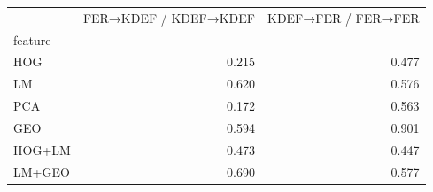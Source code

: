\begin{tabular}{lrr}
\toprule
 & FER→KDEF / KDEF→KDEF & KDEF→FER / FER→FER \\
feature &  &  \\
\midrule
HOG & 0.215 & 0.477 \\
LM & 0.620 & 0.576 \\
PCA & 0.172 & 0.563 \\
GEO & 0.594 & 0.901 \\
HOG+LM & 0.473 & 0.447 \\
LM+GEO & 0.690 & 0.577 \\
\bottomrule
\end{tabular}
